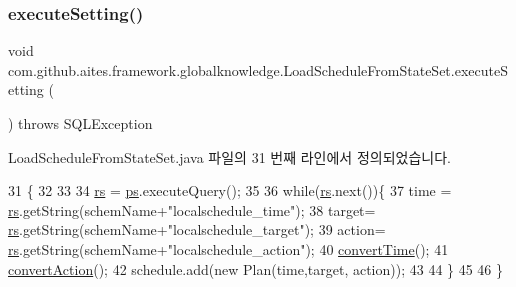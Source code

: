 \subsubsection{\texorpdfstring{execute\+Setting()}{executeSetting()}}
{\footnotesize\ttfamily void com.\+github.\+aites.\+framework.\+globalknowledge.\+Load\+Schedule\+From\+State\+Set.\+execute\+Setting (\begin{DoxyParamCaption}{ }\end{DoxyParamCaption}) throws S\+Q\+L\+Exception}



Load\+Schedule\+From\+State\+Set.\+java 파일의 31 번째 라인에서 정의되었습니다.


\begin{DoxyCode}
31                                                      \{
32         
33         
34         \mbox{\hyperlink{classcom_1_1github_1_1aites_1_1framework_1_1globalknowledge_1_1_d_b_connector_a36c87b41d86e8382bea688b2ca209764}{rs}} = \mbox{\hyperlink{classcom_1_1github_1_1aites_1_1framework_1_1globalknowledge_1_1_d_b_connector_a2a6dbc151015e5fe147a4d155ae7a145}{ps}}.executeQuery();
35         
36         \textcolor{keywordflow}{while}(\mbox{\hyperlink{classcom_1_1github_1_1aites_1_1framework_1_1globalknowledge_1_1_d_b_connector_a36c87b41d86e8382bea688b2ca209764}{rs}}.next())\{     
37             time = \mbox{\hyperlink{classcom_1_1github_1_1aites_1_1framework_1_1globalknowledge_1_1_d_b_connector_a36c87b41d86e8382bea688b2ca209764}{rs}}.getString(schemName+\textcolor{stringliteral}{"localschedule\_time"});
38             target= \mbox{\hyperlink{classcom_1_1github_1_1aites_1_1framework_1_1globalknowledge_1_1_d_b_connector_a36c87b41d86e8382bea688b2ca209764}{rs}}.getString(schemName+\textcolor{stringliteral}{"localschedule\_target"});
39             action= \mbox{\hyperlink{classcom_1_1github_1_1aites_1_1framework_1_1globalknowledge_1_1_d_b_connector_a36c87b41d86e8382bea688b2ca209764}{rs}}.getString(schemName+\textcolor{stringliteral}{"localschedule\_action"});
40             \mbox{\hyperlink{classcom_1_1github_1_1aites_1_1framework_1_1globalknowledge_1_1_load_schedule_from_state_set_a1894854faffd845ebc86877bd299dd51}{convertTime}}();
41             \mbox{\hyperlink{classcom_1_1github_1_1aites_1_1framework_1_1globalknowledge_1_1_load_schedule_from_state_set_ad91903aa1620cad091ef94cdb1c05ae3}{convertAction}}();
42             schedule.add(\textcolor{keyword}{new} Plan(time,target, action));
43               
44          \}  
45         
46     \}
\end{DoxyCode}
\mbox{\label{classcom_1_1github_1_1aites_1_1framework_1_1globalknowledge_1_1_d_b_connector_a94ff414cd6c3dcc402787d96136b5788}} 

